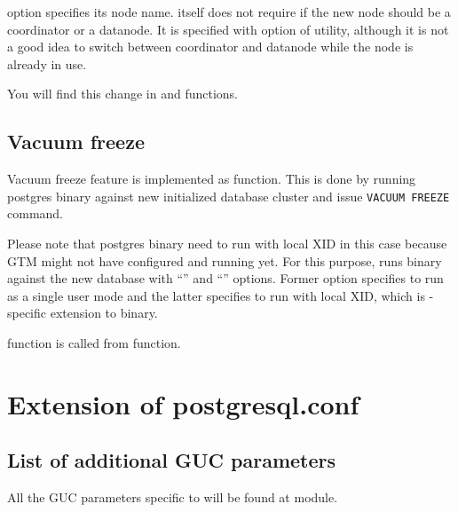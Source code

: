    option specifies its node name.
   itself does not require if the new node should be a coordinator or a datanode.
  It is specified with  option of  utility, although it is not a good idea
  to switch between coordinator and datanode while the node is already in use.
  
  You will find this change in  and  functions.



\subsection{Vacuum freeze}

  Vacuum freeze feature is implemented as  function.
  This is done by running postgres binary against new initialized database cluster and issue
  \texttt{VACUUM FREEZE} command.

  Please note that postgres binary need to run with local XID in this case because GTM might
  not have configured and running yet.
  For this purpose,  runs  binary against the new database
  with ``'' and ``'' options.
  Former option specifies  to run as a single user mode and the latter
  specifies to run with local XID, which is \XC-specific extension to 
  binary.

   function is called from  function.



\section{\label{sec:pgconf}Extension of postgresql.conf}



\subsection{List of additional GUC parameters}

  All the GUC parameters specific to \XC{} will be found at  module.
  
  
